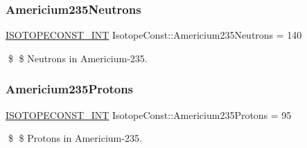 \subsubsection{\texorpdfstring{Americium235\+Neutrons}{Americium235Neutrons}}
{\footnotesize\ttfamily \mbox{\hyperlink{group___isotope_const-_macros_ga5f18360b3e99483a35c32d789e62621c}{I\+S\+O\+T\+O\+P\+E\+C\+O\+N\+S\+T\+\_\+\+I\+NT}} Isotope\+Const\+::\+Americium235\+Neutrons = 140}

\$ \$ Neutrons in Americium-\/235. \mbox{\label{group___isotope_const-_americium-_am235_gacb58d99c5d94f877af9dc7cc1b0bd00d}} 
\subsubsection{\texorpdfstring{Americium235\+Protons}{Americium235Protons}}
{\footnotesize\ttfamily \mbox{\hyperlink{group___isotope_const-_macros_ga5f18360b3e99483a35c32d789e62621c}{I\+S\+O\+T\+O\+P\+E\+C\+O\+N\+S\+T\+\_\+\+I\+NT}} Isotope\+Const\+::\+Americium235\+Protons = 95}

\$ \$ Protons in Americium-\/235. 